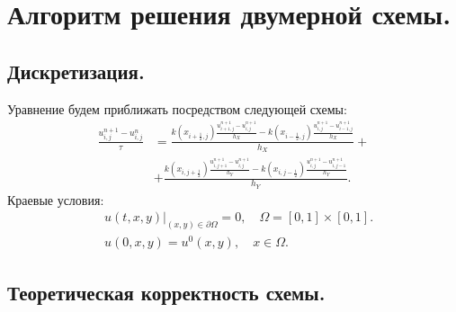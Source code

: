 \documentclass[14pt,a4paper]{extarticle}
\newcommand{\1}{\mathbbm{1}}
\begin{document}
\section{Алгоритм решения двумерной схемы.}
\subsection{Дискретизация.}
Уравнение будем приближать посредством следующей схемы:
\begin{align*}
    \frac{u^{n+1}_{i,j} - u^n_{i,j}}{\tau} &= \frac{k(x_{i + \frac{1}{2}, j}) \frac{u^{n+1}_{i+1, j} - u^{n+1}_{i, j}}{h_X} - k(x_{i- \frac{1}{2}, j}) \frac{u^{n+1}_{i, j} - u^{n+1}_{i-1, j}}{h_X}}{h_X} + \\
    &+  \frac{k(x_{i, j + \frac{1}{2}}) \frac{u^{n+1}_{i, j+1} - u^{n+1}_{i, j}}{h_Y} - k(x_{i, j- \frac{1}{2}}) \frac{u^{n+1}_{i, j} - u^{n+1}_{i, j-1}}{h_Y}}{h_Y}.
\end{align*}
Краевые условия:
\begin{align*} 
    &u(t, x, y) \big| _{(x, y) \in \partial \Omega} = 0, \quad \Omega = [0,1] \times [0, 1]. \\
    &u(0, x, y) = u^0(x, y), \quad x \in \Omega. 
\end{align*}

\subsection{Теоретическая корректность схемы.}
\end{document}
